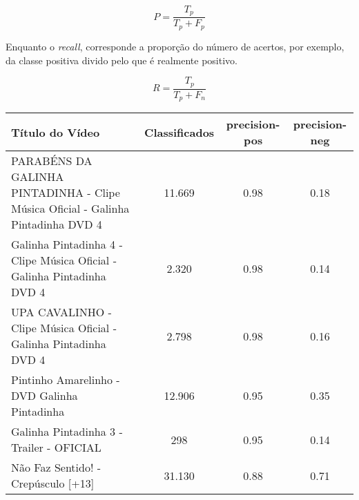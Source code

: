 
\begin{equation}
\label{eq:precision-descr}
 {P} = \frac{{T_p}}{{T_p}+{F_p}}
\end{equation}


Enquanto o \textit{recall}, corresponde a proporção do número de acertos, por exemplo, da classe positiva divido pelo que é realmente positivo.

\begin{equation}
\label{eq:recall-descr}
 {R} = \frac{{T_p}}{{T_p}+{F_n}}
\end{equation}

\begin{table}[H] \footnotesize
\centering
	
\begin{tabular}{|p{5.5cm}|c|c|c|}
\hline
\textbf{Título do Vídeo} & \textbf{Classificados} & \textbf{precision-pos} & \textbf{precision-neg} \\ \hline
PARABÉNS DA GALINHA PINTADINHA - Clipe Música Oficial - Galinha Pintadinha DVD 4 & 11.669 & 0.98 & 0.18 \\ \hline
Galinha Pintadinha 4 - Clipe Música Oficial - Galinha Pintadinha DVD 4 & 2.320 & 0.98 & 0.14 \\ \hline
UPA CAVALINHO - Clipe Música Oficial - Galinha Pintadinha DVD 4 & 2.798 & 0.98 & 0.16 \\ \hline
Pintinho Amarelinho - DVD Galinha Pintadinha & 12.906 & 0.95 & 0.35 \\ \hline
Galinha Pintadinha 3 - Trailer - OFICIAL & 298 & 0.95 & 0.14 \\ \hline
Não Faz Sentido! - Crepúsculo [+13] & 31.130 & 0.88 & 0.71\\ \hline
\end{tabular}

\end{table}

